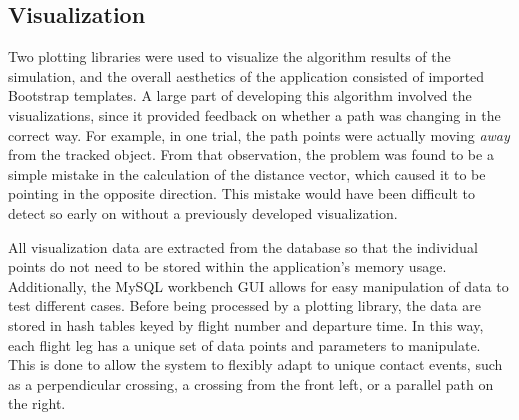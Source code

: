 \documentclass[conf]{new-aiaa}
\begin{document}



\subsection{Visualization}
Two plotting libraries were used to visualize the algorithm results of the simulation, and the overall aesthetics of the application consisted of imported Bootstrap templates. A large part of developing this algorithm involved the visualizations, since it provided feedback on whether a path was changing in the correct way. For example, in one trial, the path points were actually moving \emph{away} from the tracked object. From that observation, the problem was found to be a simple mistake in the calculation of the distance vector, which caused it to be pointing in the opposite direction. This mistake would have been difficult to detect so early on without a previously developed visualization.

All visualization data are extracted from the database so that the individual points do not need to be stored within the application's memory usage. Additionally, the MySQL workbench GUI allows for easy manipulation of data to test different cases. Before being processed by a plotting library, the data are stored in hash tables keyed by flight number and departure time. In this way, each flight leg has a unique set of data points and parameters to manipulate. This is done to allow the system to flexibly adapt to unique contact events, such as a perpendicular crossing, a crossing from the front left, or a parallel path on the right.
\end{document}
